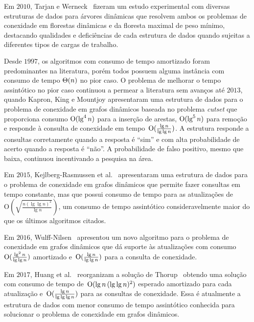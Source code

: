 Em $2010$, Tarjan e Werneck~\cite{tarjanWerneck2010} fizeram um estudo experimental com diversas estruturas de dados para árvores dinâmicas que resolvem ambos os problemas de conexidade em florestas dinâmicas e da floresta maximal de peso mínimo,
destacando qualidades e deficiências de cada estrutura de dados quando sujeitas a diferentes tipos de cargas de trabalho. 

Desde $1997$, os algoritmos com consumo de tempo amortizado foram predominantes na literatura, porém todos possuem alguma instância com consumo de tempo $\Theta(n)$ no pior caso.
O problema de melhorar o tempo assintótico no pior caso continuou a permear a literatura sem avanços até $2013$, quando Kapron, King e Mountjoy \cite{bruceM} apresentaram uma estrutura de dados para o problema de conexidade em grafos dinâmicos baseada no problema \textit{cutset} que proporciona consumo $\mathrm{O}(\lg^4 n)$ para a inserção de arestas, $\mathrm{O}(\lg^5 n)$ para remoção e responde à consulta de conexidade em tempo~$\mathrm{O}(\frac{\lg n}{\lg\lg n})$.
A estrutura responde a consultas corretamente quando a resposta é “sim” e com alta probabilidade de acerto quando a resposta é “não”. A probabilidade de falso positivo, mesmo que baixa, continuou incentivando a pesquisa na área. 

\newpage
Em $2015$, Kejlberg-Rasmussen et al.~\cite{kejlbergrasmussen_et_al} apresentaram uma estrutura de dados para o problema de conexidade em grafos dinâmicos que permite fazer consultas em tempo constante, mas que possui consumo de tempo para as atualizações de~$\mathrm{O}\!\left(\sqrt{\frac{n\left(\lg \lg n\right)^2}{\lg n}}\right)$, um consumo de tempo assintótico consideravelmente maior do que os últimos algoritmos citados.

Em $2016$, Wulff-Nilsen~\cite{Wulff-Nilsen2016} apresentou um novo algoritmo para o problema de conexidade em grafos dinâmicos que dá suporte às atualizações com consumo~$\mathrm{O}(\frac{\lg^2 n}{\lg \lg n})$ amortizado e~$\mathrm{O}(\frac{\lg n}{\lg \lg n})$ para a consulta de conexidade.

Em $2017$, Huang et al.~\cite{fastestConn} reorganizam a solução de Thorup~\cite{Thorup2000} obtendo uma solução com consumo de tempo de~$\mathrm{O}(\lg n\, (\lg\lg n)^2)$ esperado amortizado para cada atualização e~$\mathrm{O}(\frac{\lg n}{\lg \lg \lg n})$ para as consultas de conexidade.
Essa é atualmente a estrutura de dados com menor consumo de tempo assintótico conhecida para solucionar o problema de conexidade em grafos dinâmicos.

